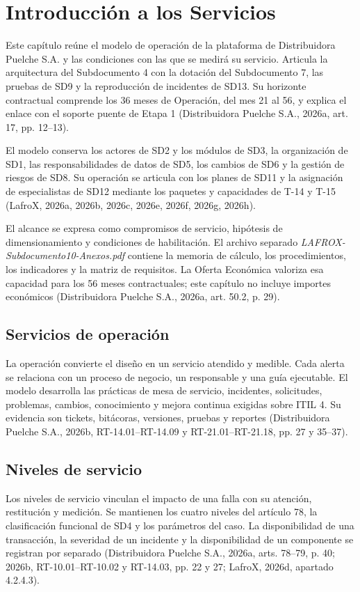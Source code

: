 \chapter{Introducción a los Servicios}
\label{cap:sd10}

Este capítulo reúne el modelo de operación de la plataforma de Distribuidora Puelche S.A. y las condiciones con las que se medirá su servicio. Articula la arquitectura del Subdocumento 4 con la dotación del Subdocumento 7, las pruebas de SD9 y la reproducción de incidentes de SD13. Su horizonte contractual comprende los 36 meses de Operación, del mes 21 al 56, y explica el enlace con el soporte puente de Etapa 1 (Distribuidora Puelche S.A., 2026a, art. 17, pp. 12--13).

El modelo conserva los actores de SD2 y los módulos de SD3, la organización de SD1, las responsabilidades de datos de SD5, los cambios de SD6 y la gestión de riesgos de SD8. Su operación se articula con los planes de SD11 y la asignación de especialistas de SD12 mediante los paquetes y capacidades de T-14 y T-15 (LafroX, 2026a, 2026b, 2026c, 2026e, 2026f, 2026g, 2026h).

El alcance se expresa como compromisos de servicio, hipótesis de dimensionamiento y condiciones de habilitación. El archivo separado \textit{LAFROX-Subdocumento10-Anexos.pdf} contiene la memoria de cálculo, los procedimientos, los indicadores y la matriz de requisitos. La Oferta Económica valoriza esa capacidad para los 56 meses contractuales; este capítulo no incluye importes económicos (Distribuidora Puelche S.A., 2026a, art. 50.2, p. 29).

\section{Servicios de operación}
\label{sec:sd10-servicios}
La operación convierte el diseño en un servicio atendido y medible. Cada alerta se relaciona con un proceso de negocio, un responsable y una guía ejecutable. El modelo desarrolla las prácticas de mesa de servicio, incidentes, solicitudes, problemas, cambios, conocimiento y mejora continua exigidas sobre ITIL 4. Su evidencia son tickets, bitácoras, versiones, pruebas y reportes (Distribuidora Puelche S.A., 2026b, RT-14.01--RT-14.09 y RT-21.01--RT-21.18, pp. 27 y 35--37).

\section{Niveles de servicio}
\label{sec:sd10-niveles}
Los niveles de servicio vinculan el impacto de una falla con su atención, restitución y medición. Se mantienen los cuatro niveles del artículo 78, la clasificación funcional de SD4 y los parámetros del caso. La disponibilidad de una transacción, la severidad de un incidente y la disponibilidad de un componente se registran por separado (Distribuidora Puelche S.A., 2026a, arts. 78--79, p. 40; 2026b, RT-10.01--RT-10.02 y RT-14.03, pp. 22 y 27; LafroX, 2026d, apartado 4.2.4.3).


